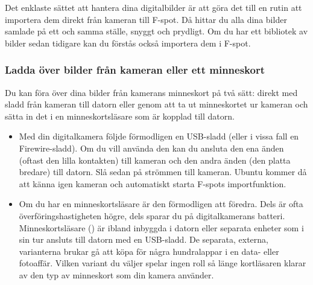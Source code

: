 \documentclass[a4paper,final]{memoir} %
\begin{document}

Det enklaste sättet att hantera dina digitalbilder är att göra det till en rutin att importera dem direkt från kameran till F-spot. Då hittar du alla dina bilder samlade på ett och samma ställe, snyggt och prydligt. Om du har ett bibliotek av bilder sedan tidigare kan du förstås också importera dem i F-spot.

\subsubsection{Ladda över bilder från kameran eller ett minneskort}

Du kan föra över dina bilder från kamerans minneskort på två sätt: direkt med sladd från kameran till datorn eller genom att ta ut minneskortet ur kameran och sätta in det i en minneskortsläsare som är kopplad till datorn.

\begin{itemize}

\item Med din digitalkamera följde förmodligen en USB-sladd (eller i vissa fall en Firewire-sladd). Om du vill använda den kan du ansluta den ena änden (oftast den lilla kontakten) till kameran och den andra änden (den platta bredare) till datorn. Slå sedan på strömmen till kameran. Ubuntu kommer då att känna igen kameran och automatiskt starta F-spots importfunktion.


\item Om du har en minneskortsläsare är den förmodligen att föredra. Dels är ofta överföringshastigheten högre, dels sparar du på digitalkamerans batteri. Minneskortsläsare () är ibland inbyggda i datorn eller separata enheter som i sin tur ansluts till datorn med en USB-sladd. De separata, externa, varianterna brukar gå att köpa för några hundralappar i en data- eller fotoaffär. Vilken variant du väljer spelar ingen roll så länge kortläsaren klarar av den typ av minneskort som din kamera använder. 


\end{itemize}
\end{document}
